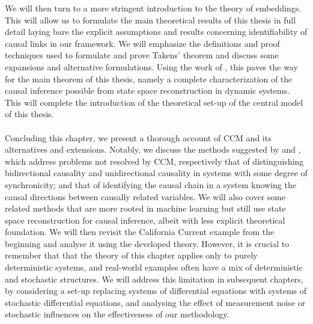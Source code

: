 \documentclass[11pt, a4paper]{memoir}
\theoremstyle{break}
\theoremstyle{break}
\theoremstyle{nonumberplain}
\begin{document}
We will then turn to a more stringent introduction to the theory of embeddings. This will allow us to formulate the main theoretical results of this thesis in full detail laying bare the explicit assumptions and results concerning identifiability of causal links in our framework. We will emphasize the definitions and proof techniques used to formulate and prove Takens' theorem and discuss some expansions and alternative formulations. Using the work of \cite{mathFound}, this paves the way for the main theorem of this thesis, namely a complete characterization of the causal inference possible from state space reconstruction in dynamic systems. This will complete the introduction of the theoretical set-up of the central model of this thesis.\\\\
Concluding this chapter, we present a thorough account of CCM and its alternatives and extensions. Notably, we discuss the methods suggested by \cite{Ye2015} and \cite{Leng2020}, which address problems not resolved by CCM, respectively that of distinguishing bidirectional causality and unidirectional causality in systems with some degree of synchronicity; and that of identifying the causal chain in a system knowing the causal directions between causally related variables. We will also cover some related methods that are more rooted in machine learning but still use state space reconstruction for causal inference, albeit with less explicit theoretical foundation. We will then revisit the California Current example from the beginning and analyse it using the developed theory. However, it is crucial to remember that that the theory of this chapter applies only to purely deterministic systems, and real-world examples often have a mix of deterministic and stochastic structures. We will address this limitation in subsequent chapters, by considering a set-up replacing systems of differential equations with systems of stochastic differential equations, and analysing the effect of measurement noise or stochastic influences on the effectiveness of our methodology.
\newpage
\end{document}
